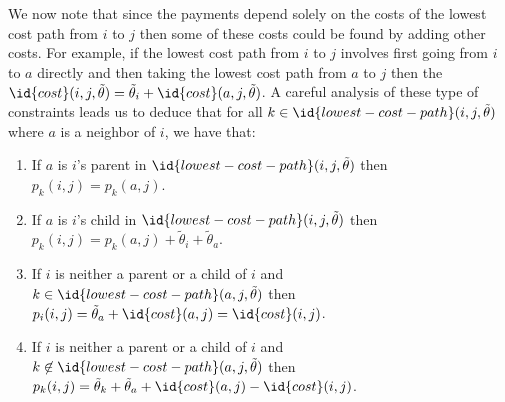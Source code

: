 We now note that since the payments depend solely on the costs of the
lowest cost path from $i$ to $j$ then some of these costs could be
found by adding other costs. For example, if the lowest cost path from
$i$ to $j$ involves first going from $i$ to $a$ directly and then
taking the lowest cost path from $a$ to $j$ then the
$\id{cost}(i,j,\tilde{\theta}) = \tilde{\theta}_i +
\id{cost}(a,j,\tilde{\theta})$. A careful analysis of these type of
constraints leads us to deduce that for all $k \in
\id{lowest-cost-path}(i,j,\tilde{\theta})$ where $a$ is a neighbor of
$i$, we have that:
\begin{enumerate}
\item If $a$ is $i$'s parent in
  $\id{lowest-cost-path}(i,j,\tilde{\theta})$ then $p_k(i,j) =
  p_k(a,j)$.
\item If $a$ is $i$'s child in
  $\id{lowest-cost-path}(i,j,\tilde{\theta})$ then $p_k(i,j) =
  p_k(a,j) + \tilde{\theta}_i + \tilde{\theta}_a$.
\item If $i$ is neither a parent or a child of $i$ and $k \in
  \id{lowest-cost-path}(a,j,\tilde{\theta})$ then $p_i(i,j) =
  \tilde{\theta}_a + \id{cost}(a,j) = \id{cost}(i,j)$.
\item If $i$ is neither a parent or a child of $i$ and $k \not\in
  \id{lowest-cost-path}(a,j,\tilde{\theta})$ then $p_k(i,j) =
  \tilde{\theta}_k + \tilde{\theta}_a + \id{cost}(a,j) -
  \id{cost}(i,j)$.
\end{enumerate}

